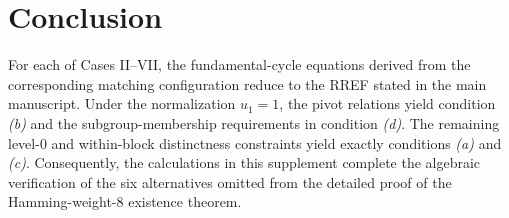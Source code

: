 \documentclass[11pt]{article}
\begin{document}
\section{Conclusion}
For each of Cases II--VII, the fundamental-cycle equations derived from the corresponding matching configuration reduce to the RREF stated in the main manuscript.  Under the normalization $u_1=1$, the pivot relations yield condition \emph{(b)} and the subgroup-membership requirements in condition \emph{(d)}.  The remaining level-$0$ and within-block distinctness constraints yield exactly conditions \emph{(a)} and \emph{(c)}.  Consequently, the calculations in this supplement complete the algebraic verification of the six alternatives omitted from the detailed proof of the Hamming-weight-$8$ existence theorem.
\end{document}
